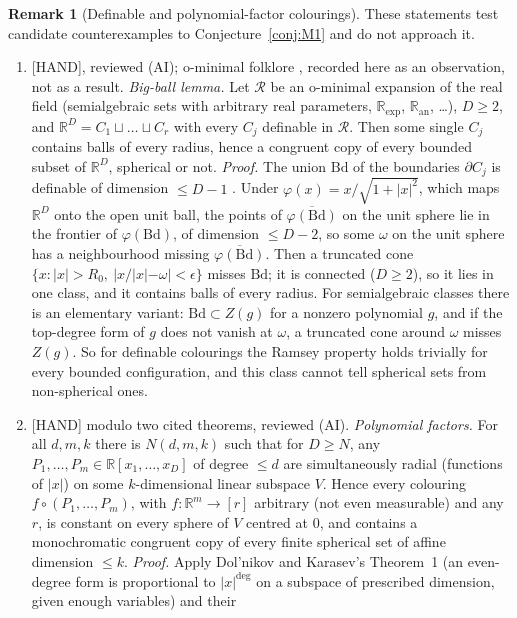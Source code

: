 \documentclass[11pt]{amsart}
\newcommand{\st}[1]{\textsf{[#1]}}
\newcommand{\R}{\mathbb{R}}
\theoremstyle{plain}
\theoremstyle{definition}
\newtheorem{remark}[theorem]{Remark}
\begin{document}
\begin{remark}[Definable and polynomial-factor colourings]\label{rem:definable}
These statements test candidate counterexamples to Conjecture~\ref{conj:M1} and do not approach it.
\begin{enumerate}
\item[(a)] \st{HAND}, reviewed (AI); o-minimal folklore \cite{vdDries}, recorded here as an observation, not
as a result. \emph{Big-ball lemma.} Let $\mathcal R$ be an o-minimal expansion of the
real field (semialgebraic sets with arbitrary real parameters, $\R_{\exp}$, $\R_{\mathrm{an}}$, \dots), $D\ge2$,
and $\R^D=C_1\sqcup\dots\sqcup C_r$ with every $C_j$ definable in $\mathcal R$. Then some single $C_j$ contains
balls of every radius, hence a congruent copy of every bounded subset of $\R^D$, spherical or not.
\emph{Proof.} The union $\mathrm{Bd}$ of the boundaries $\partial C_j$ is definable of dimension $\le D-1$
\cite[Ch.~4]{vdDries}. Under $\varphi(x)=x/\sqrt{1+|x|^2}$, which maps $\R^D$ onto the open unit ball, the
points of $\overline{\varphi(\mathrm{Bd})}$ on the unit sphere lie in the frontier of $\varphi(\mathrm{Bd})$,
of dimension $\le D-2$, so some $\omega$ on the unit sphere has a neighbourhood missing
$\overline{\varphi(\mathrm{Bd})}$. Then a truncated cone $\{x:|x|>R_0,\ |x/|x|-\omega|<\epsilon\}$ misses
$\mathrm{Bd}$; it is connected ($D\ge2$), so it lies in one class, and it contains balls of every radius.
For semialgebraic classes there is an elementary variant: $\mathrm{Bd}\subset Z(g)$ for a nonzero polynomial
$g$, and if the top-degree form of $g$ does not vanish at $\omega$, a truncated cone around $\omega$ misses
$Z(g)$. So for definable colourings the Ramsey property holds trivially for every bounded
configuration, and this class cannot tell spherical sets from non-spherical ones.
\item[(b)] \st{HAND} modulo two cited theorems, reviewed (AI). \emph{Polynomial factors.} For all $d,m,k$ there
is $N(d,m,k)$ such that for $D\ge N$, any $P_1,\dots,P_m\in\R[x_1,\dots,x_D]$ of degree $\le d$ are
simultaneously radial (functions of $|x|$) on some $k$-dimensional linear subspace $V$. Hence every colouring
$f\circ(P_1,\dots,P_m)$, with $f:\R^m\to[r]$ arbitrary (not even measurable) and any $r$, is constant on every
sphere of $V$ centred at $0$, and contains a monochromatic congruent copy of every finite spherical set of
affine dimension $\le k$. \emph{Proof.} Apply Dol'nikov and Karasev's Theorem~1 (an even-degree form is
proportional to $|x|^{\deg}$ on a subspace of prescribed dimension, given enough variables) and their

\end{enumerate}
\end{remark}
\end{document}
